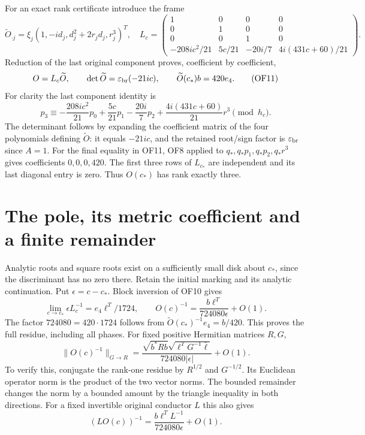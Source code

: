\documentclass[11pt]{article}
\begin{document}
For an exact rank certificate introduce the frame
\begin{equation}
 \widetilde O_{\cdot j}=\xi_j(1,-id_j,d_j^2+2r_jd_j,r_j^3)^T,
 \quad
 L_c=\begin{pmatrix}
 1&0&0&0\\0&1&0&0\\0&0&1&0\\
 -208ic^2/21&5c/21&-20i/7&4i(431c+60)/21
 \end{pmatrix}.\tag{OF10}
\end{equation}
Reduction of the last original component proves, coefficient by
coefficient,
\begin{equation}
 O=L_c\widetilde O,\qquad
 \det\widetilde O=\varepsilon_{\rm br}(-21ic),\qquad
 \widetilde O(c_*)b=420e_4.\tag{OF11}
\end{equation}
For clarity the last component identity is
\[
 p_3\equiv-\frac{208ic^2}{21}p_0+\frac{5c}{21}p_1
 -\frac{20i}{7}p_2+\frac{4i(431c+60)}{21}r^3\pmod{h_c}.
\]
The determinant follows by expanding the coefficient matrix of the
four polynomials defining $\widetilde O$: it equals $-21ic$, and
the retained root/sign factor is $\varepsilon_{\rm br}$ since $A=1$.
For the final equality in OF11, OF8 applied to
$q_*,q_*p_1,q_*p_2,q_*r^3$ gives coefficients $0,0,0,420$.
The first three rows of $L_{c_*}$ are independent and its last
diagonal entry is zero. Thus $O(c_*)$ has rank exactly three.

\section{The pole, its metric coefficient and a finite remainder}
Analytic roots and square roots exist on a sufficiently small disk
about $c_*$, since the discriminant has no zero there. Retain the
initial marking and its analytic continuation. Put $\epsilon=c-c_*$.
Block inversion of OF10 gives
\begin{equation}
 \lim_{c\to c_*}\epsilon L_c^{-1}=e_4\ell^T/1724,
 \qquad
 O(c)^{-1}=\frac{b\ell^T}{724080\epsilon}+O(1).
 \tag{OF12}
\end{equation}
The factor $724080=420\cdot1724$ follows from
$\widetilde O(c_*)^{-1}e_4=b/420$. This proves the full residue,
including all phases. For fixed positive Hermitian matrices $R,G$,
\begin{equation}
 \|O(c)^{-1}\|_{G\to R}
 =\frac{\sqrt{b^*Rb}\sqrt{\ell^TG^{-1}\bar\ell}}
 {724080|\epsilon|}+O(1).\tag{OF13}
\end{equation}
To verify this, conjugate the rank-one residue by $R^{1/2}$ and
$G^{-1/2}$. Its Euclidean operator norm is the product of the
two vector norms. The bounded remainder changes the norm by a
bounded amount by the triangle inequality in both directions.
For a fixed invertible original conductor $L$ this also gives
\[
 (LO(c))^{-1}=\frac{b\ell^TL^{-1}}{724080\epsilon}+O(1).
\]
\end{document}
